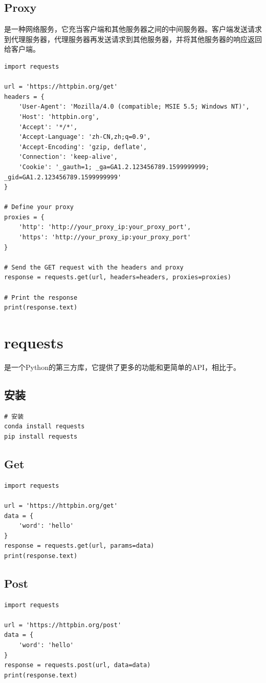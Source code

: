 \subsection{Proxy}
是一种网络服务，它充当客户端和其他服务器之间的中间服务器。客户端发送请求到代理服务器，代理服务器再发送请求到其他服务器，并将其他服务器的响应返回给客户端。

\begin{lstlisting}[style=demostyle,numbers=none]
import requests

url = 'https://httpbin.org/get'
headers = {
    'User-Agent': 'Mozilla/4.0 (compatible; MSIE 5.5; Windows NT)',
    'Host': 'httpbin.org',
    'Accept': '*/*',
    'Accept-Language': 'zh-CN,zh;q=0.9',
    'Accept-Encoding': 'gzip, deflate',
    'Connection': 'keep-alive',
    'Cookie': '_gauth=1; _ga=GA1.2.123456789.1599999999; _gid=GA1.2.123456789.1599999999'
}

# Define your proxy
proxies = {
    'http': 'http://your_proxy_ip:your_proxy_port',
    'https': 'http://your_proxy_ip:your_proxy_port'
}

# Send the GET request with the headers and proxy
response = requests.get(url, headers=headers, proxies=proxies)

# Print the response
print(response.text)
\end{lstlisting}

\section{requests}
是一个Python的第三方库，它提供了更多的功能和更简单的API，相比于。
\subsection{安装}
\begin{lstlisting}[style=demostyle,numbers=none]
# 安装
conda install requests
pip install requests
\end{lstlisting}

\subsection{Get}
\begin{lstlisting}[style=demostyle,numbers=none]
import requests

url = 'https://httpbin.org/get'
data = {
    'word': 'hello'
}
response = requests.get(url, params=data)
print(response.text)
\end{lstlisting}

\subsection{Post}
\begin{lstlisting}[style=demostyle,numbers=none]
import requests

url = 'https://httpbin.org/post'
data = {
    'word': 'hello'
}
response = requests.post(url, data=data)
print(response.text)
\end{lstlisting}



